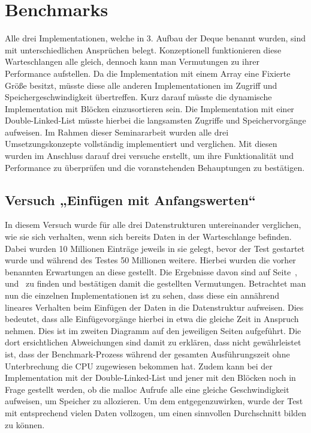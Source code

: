 \documentclass{TUBAFarbeiten}
\begin{document}
\section{Benchmarks}
Alle drei Implementationen, welche in 3. Aufbau der Deque benannt wurden, sind mit unterschiedlichen Ansprüchen belegt. Konzeptionell funktionieren diese Warteschlangen alle gleich, dennoch kann man Vermutungen zu ihrer Performance aufstellen. Da die Implementation mit einem Array eine Fixierte Größe besitzt, müsste diese alle anderen Implementationen im Zugriff und Speichergeschwindigkeit übertreffen. Kurz darauf müsste die dynamische Implementation mit Blöcken einzusortieren sein. Die Implementation mit einer Double-Linked-List müsste hierbei die langsamsten Zugriffe und Speichervorgänge aufweisen.
Im Rahmen dieser Seminararbeit wurden alle drei Umsetzungskonzepte vollständig implementiert und verglichen. Mit diesen wurden im Anschluss darauf drei versuche erstellt, um ihre Funktionalität und Performance zu überprüfen und die voranstehenden Behauptungen zu bestätigen. 
\subsection{Versuch „Einfügen mit Anfangswerten“}
In diesem Versuch wurde für alle drei Datenstrukturen untereinander verglichen, wie sie sich verhalten, wenn sich bereits Daten in der Warteschlange befinden. Dabei wurden 10 Millionen Einträge jeweils in sie gelegt, bevor der Test gestartet wurde und während des Testes 50 Millionen weitere. Hierbei wurden die vorher benannten Erwartungen an diese gestellt. Die Ergebnisse davon sind auf Seite~\pageref{fig:Array10-50},~\pageref{fig:Linked10-50} und~\pageref{fig:Block10-50} zu finden und bestätigen damit die gestellten Vermutungen.
Betrachtet man nun die einzelnen Implementationen ist zu sehen, dass diese ein annährend lineares Verhalten beim Einfügen der Daten in die Datenstruktur aufweisen. Dies bedeutet, dass alle Einfügevorgänge hierbei in etwa die gleiche Zeit in Anspruch nehmen. Dies ist im zweiten Diagramm auf den jeweiligen Seiten aufgeführt. Die dort ersichtlichen Abweichungen sind damit zu erklären, dass nicht gewährleistet ist, dass der Benchmark-Prozess während der gesamten Ausführungszeit ohne Unterbrechung die CPU zugewiesen bekommen hat. Zudem kann bei der Implementation mit der Double-Linked-List und jener mit den Blöcken noch in Frage gestellt werden, ob die malloc Aufrufe alle eine gleiche Geschwindigkeit aufweisen, um Speicher zu allozieren. Um dem entgegenzuwirken, wurde der Test mit entsprechend vielen Daten vollzogen, um einen sinnvollen Durchschnitt bilden zu können.
\end{document}
